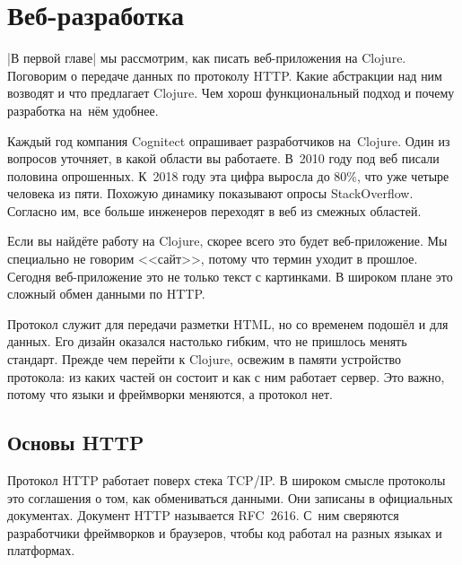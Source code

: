 \chapter{Веб-разработка}

\begin{teaser}
\spverb|В первой главе| мы рассмотрим, как писать веб-приложения на
Clojure. Поговорим о передаче данных по протоколу HTTP. Какие абстракции над ним
возводят и что предлагает Clojure. Чем хорош функциональный подход и почему
разработка на~н\"{е}м удобнее.
\end{teaser}


Каждый год компания Cognitect
опрашивает
разработчиков на~Clojure. Один из вопросов уточняет, в какой области вы
работаете. В~2010 году под веб писали половина опрошенных. К~2018 году эта цифра
выросла до 80\%, что уже четыре человека из пяти. Похожую динамику показывают
опросы
StackOverflow. Согласно
им, все больше инженеров переходят в веб из смежных областей.

Если вы найд\"{е}те работу на Clojure, скорее всего это будет веб-приложение. Мы
специально не говорим <<сайт>>, потому что термин уходит в прошлое. Сегодня
веб-приложение это не только текст с картинками. В широком плане это сложный
обмен данными по HTTP.

Протокол служит для передачи разметки HTML, но со временем подош\"{е}л и для
данных. Его дизайн оказался настолько гибким, что не пришлось менять
стандарт. Прежде чем перейти к Clojure, освежим в памяти устройство протокола:
из каких частей он состоит и как с ним работает сервер. Это важно, потому что
языки и фреймворки меняются, а протокол нет.

\section{Основы HTTP}


Протокол HTTP работает поверх стека TCP/IP. В широком смысле протоколы это
соглашения о том, как обмениваться данными. Они записаны в официальных
документах. Документ HTTP называется RFC~2616.
С~ним сверяются разработчики фреймворков и браузеров, чтобы код работал
на разных языках и платформах.

